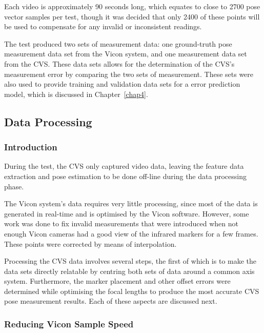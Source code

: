 Each video is approximately 90 seconds long, which equates to close to 2700 pose vector samples per test, though it was decided that only 2400 of these points will be used to compensate for any invalid or inconsistent readings. 

The test produced two sets of measurement data: one ground-truth pose measurement data set from the Vicon system, and one measurement data set from the CVS\@. These data sets allows for the determination of the CVS's measurement error by comparing the two sets of measurement. These sets were also used to provide training and validation data sets for a error prediction model, which is discussed in Chapter~\ref{chap4}. 

\subsection{Data Processing}

\subsubsection{Introduction}

During the test, the CVS only captured video data, leaving the feature data extraction and pose estimation to be done off-line during the data processing phase. 

The Vicon system's data requires very little processing, since most of the data is generated in real-time and is optimised by the Vicon software. However, some work was done to fix invalid measurements that were introduced when not enough Vicon cameras had a good view of the infrared markers for a few frames. These points were corrected by means of interpolation. %

Processing the CVS data involves several steps, the first of which is to make the data sets directly relatable by centring  both sets of data around a common axis system. Furthermore, the marker placement and other offset errors were determined while optimising the focal lengths to produce the most accurate CVS pose measurement results. Each of these aspects are discussed next.

\subsubsection{Reducing Vicon Sample Speed}

